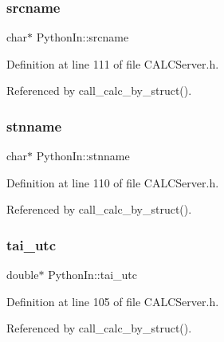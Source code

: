 \mbox{\label{struct_python_in_a5740cfc97368f1f82d4f2a6c3b8eb22b}} 
\subsubsection{\texorpdfstring{srcname}{srcname}}
{\footnotesize\ttfamily char$\ast$ Python\+In\+::srcname}



Definition at line 111 of file C\+A\+L\+C\+Server.\+h.



Referenced by call\+\_\+calc\+\_\+by\+\_\+struct().

\mbox{\label{struct_python_in_a0e1b4ee89ed431b9b4a16ca15d7cb8fd}} 
\subsubsection{\texorpdfstring{stnname}{stnname}}
{\footnotesize\ttfamily char$\ast$ Python\+In\+::stnname}



Definition at line 110 of file C\+A\+L\+C\+Server.\+h.



Referenced by call\+\_\+calc\+\_\+by\+\_\+struct().

\mbox{\label{struct_python_in_a1842e57fb5cec904f398ad5c3affe267}} 
\subsubsection{\texorpdfstring{tai\+\_\+utc}{tai\_utc}}
{\footnotesize\ttfamily double$\ast$ Python\+In\+::tai\+\_\+utc}



Definition at line 105 of file C\+A\+L\+C\+Server.\+h.



Referenced by call\+\_\+calc\+\_\+by\+\_\+struct().

\mbox{\label{struct_python_in_a413347f9cb1e54604415376b0760ca59}} 
